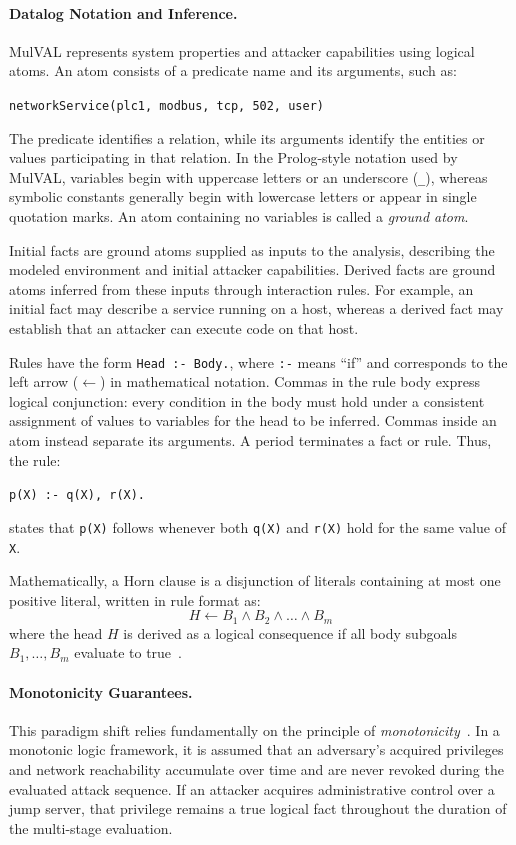 \documentclass[target=mst,aauheader=aics,style=]{thud}
\begin{document}
\paragraph{Datalog Notation and Inference.} MulVAL represents system properties and attacker capabilities using logical atoms. An atom consists of a predicate name and its arguments, such as:
\begin{center}
\texttt{networkService(plc1, modbus, tcp, 502, user)}
\end{center}
The predicate identifies a relation, while its arguments identify the entities or values participating in that relation. In the Prolog-style notation used by MulVAL, variables begin with uppercase letters or an underscore (\texttt{\_}), whereas symbolic constants generally begin with lowercase letters or appear in single quotation marks. An atom containing no variables is called a \textit{ground atom}.

Initial facts are ground atoms supplied as inputs to the analysis, describing the modeled environment and initial attacker capabilities. Derived facts are ground atoms inferred from these inputs through interaction rules. For example, an initial fact may describe a service running on a host, whereas a derived fact may establish that an attacker can execute code on that host.

Rules have the form \texttt{Head :- Body.}, where \texttt{:-} means ``if'' and corresponds to the left arrow ($\leftarrow$) in mathematical notation. Commas in the rule body express logical conjunction: every condition in the body must hold under a consistent assignment of values to variables for the head to be inferred. Commas inside an atom instead separate its arguments. A period terminates a fact or rule. Thus, the rule:
\begin{center}
\texttt{p(X) :- q(X), r(X).}
\end{center}
states that \texttt{p(X)} follows whenever both \texttt{q(X)} and \texttt{r(X)} hold for the same value of \texttt{X}.

Mathematically, a Horn clause is a disjunction of literals containing at most one positive literal, written in rule format as:
\begin{equation}
H \leftarrow B_1 \land B_2 \land \dots \land B_m
\end{equation}
where the head $H$ is derived as a logical consequence if all body subgoals $B_1, \dots, B_m$ evaluate to true~\cite{Ou05}.

\paragraph{Monotonicity Guarantees.} This paradigm shift relies fundamentally on the principle of \textit{monotonicity}~\cite{Ou05}. In a monotonic logic framework, it is assumed that an adversary's acquired privileges and network reachability accumulate over time and are never revoked during the evaluated attack sequence. If an attacker acquires administrative control over a jump server, that privilege remains a true logical fact throughout the duration of the multi-stage evaluation.
\end{document}
